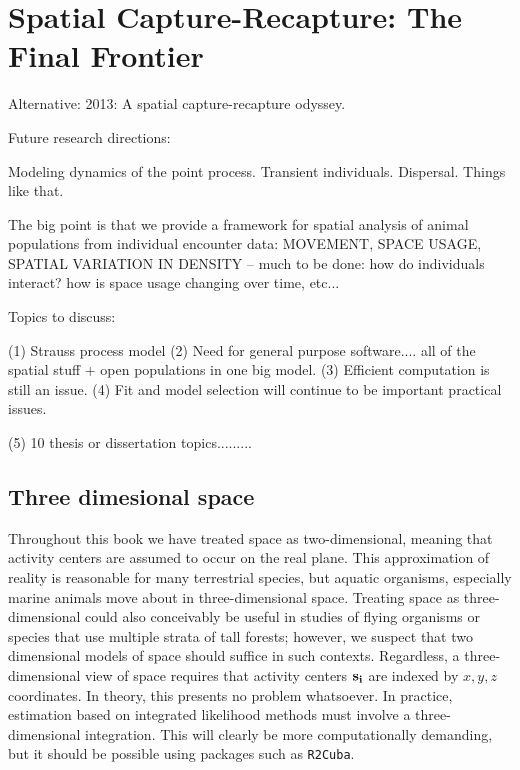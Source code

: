 


\chapter{Spatial Capture-Recapture: The Final Frontier}

\label{chapt.final}

\vspace{0.3cm}

Alternative: 2013: A spatial capture-recapture odyssey. 

Future research directions:

 Modeling dynamics of the point process. Transient individuals. 
 Dispersal. Things like that.

The big point is that we provide a framework for spatial analysis of animal populations from
individual encounter data:
MOVEMENT, SPACE USAGE, SPATIAL VARIATION IN DENSITY -- 
much to be done: how do individuals interact? how is space usage changing over time, etc...


Topics to discuss:

 (1) Strauss process model
 (2) Need for general purpose software.... all of the spatial stuff + 
open populations in one big model. 
 (3) Efficient computation is still an issue.
 (4) Fit and model selection will continue to be important practical
 issues.

 (5) 10 thesis or dissertation topics.........






\section{Three dimesional space}

Throughout this book we have treated space as
two-dimensional, meaning that activity centers are assumed to occur on
the real plane. This approximation of reality is reasonable for many
terrestrial species, but aquatic organisms, especially marine animals
move about in three-dimensional space. Treating space as
three-dimensional could also conceivably be useful in studies of flying organisms
or species that use multiple strata of tall forests; however, we
suspect that two dimensional models of space should suffice in such
contexts. Regardless, a three-dimensional view of space requires that
activity centers $\bf s_i$ are indexed by
$x,y,z$ coordinates. In theory, this presents no problem whatsoever. In
practice, estimation based on integrated likelihood methods must
involve a three-dimensional integration. This will clearly be more
computationally demanding, but it should be possible using packages
such as {\tt R2Cuba}.





